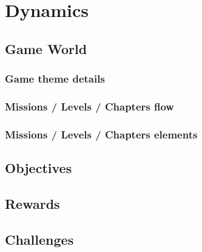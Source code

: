 \section{Dynamics}

\subsection{Game World}

\subsubsection{Game theme details}

\subsubsection{Missions / Levels / Chapters flow}

\subsubsection{Missions / Levels / Chapters elements}

\subsection{Objectives}

\subsection{Rewards}

\subsection{Challenges}

